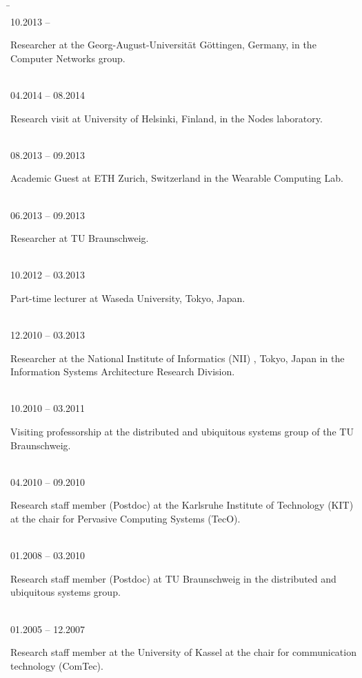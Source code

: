 \documentclass[12pt]{article}
\begin{document}
\begin{tabbing}
\hspace{3.2cm} \= \hspace{2.5cm} \=\\
10.2013 --	\>\begin{minipage}[t]{13.4cm}	Researcher at the Georg-August-Universität Göttingen, Germany, in the Computer Networks group.\end{minipage}\\[0.2cm]
04.2014 -- 08.2014 \>\begin{minipage}[t]{13.4cm}	Research visit at University of Helsinki, Finland, in the Nodes laboratory.\end{minipage}\\[0.2cm]
08.2013 -- 09.2013 \>\begin{minipage}[t]{13.4cm}	Academic Guest at ETH Zurich, Switzerland in the Wearable Computing Lab.\end{minipage}\\[0.2cm]
06.2013 -- 09.2013 \>\begin{minipage}[t]{13.4cm}	Researcher at TU Braunschweig.\end{minipage}\\[0.2cm]
10.2012 -- 03.2013 \>\begin{minipage}[t]{13.4cm}	Part-time lecturer at Waseda University, Tokyo, Japan.\end{minipage}\\[0.2cm]
12.2010 -- 03.2013 \>\begin{minipage}[t]{13.4cm}	Researcher at the National Institute of Informatics (NII) , Tokyo, Japan in the Information Systems Architecture Research Division.\end{minipage}\\[0.2cm]
10.2010 -- 03.2011 \>\begin{minipage}[t]{13.4cm}	Visiting professorship at the distributed and ubiquitous systems group of the TU Braunschweig.\end{minipage}\\[0.2cm]
04.2010 -- 09.2010 \>\begin{minipage}[t]{13.4cm}	Research staff member (Postdoc) at the Karlsruhe Institute of Technology (KIT) at the chair for Pervasive Computing Systems (TecO).\end{minipage}\\[0.2cm]
01.2008 -- 03.2010 \>\begin{minipage}[t]{13.4cm}	Research staff member (Postdoc) at TU Braunschweig in the distributed and ubiquitous systems group.\end{minipage}\\[0.2cm]
01.2005 -- 12.2007 \>\begin{minipage}[t]{13.4cm}	Research staff member at the University of Kassel at the chair for communication technology (ComTec).\end{minipage}
\end{tabbing}
\end{document}
